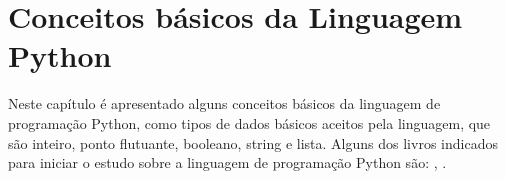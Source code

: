 

\chapter{ Conceitos básicos da Linguagem Python}

Neste capítulo é apresentado alguns conceitos básicos da linguagem de programação Python, como tipos de dados básicos aceitos pela linguagem, que são inteiro, ponto flutuante, booleano, string e lista. Alguns dos livros indicados para iniciar o estudo sobre a linguagem de programação Python são:  \cite{Lutz2007}, \cite{Perkovic2016}.

